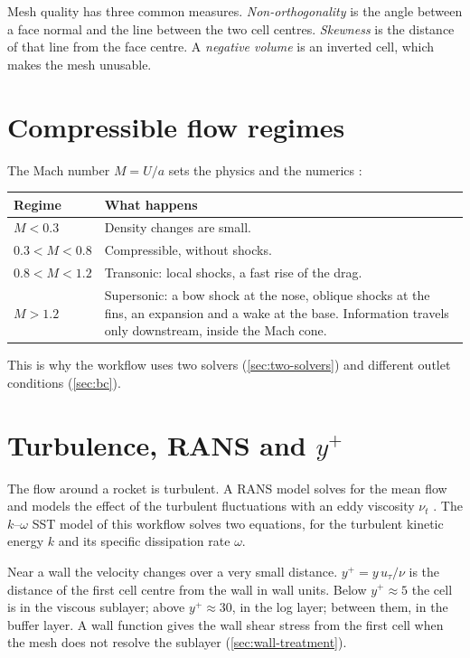 Mesh quality has three common measures. \emph{Non-orthogonality} is the angle between a
face normal and the line between the two cell centres. \emph{Skewness} is the distance
of that line from the face centre. A \emph{negative volume} is an inverted cell, which
makes the mesh unusable.

\section{Compressible flow regimes}

The Mach number $M = U/a$ sets the physics and the numerics \citep{anderson2003}:

\begin{tabularx}{\linewidth}{@{}l L@{}}
\toprule
Regime & What happens \\
\midrule
$M < 0.3$ & Density changes are small. \\
$0.3 < M < 0.8$ & Compressible, without shocks. \\
$0.8 < M < 1.2$ & Transonic: local shocks, a fast rise of the drag. \\
$M > 1.2$ & Supersonic: a bow shock at the nose, oblique shocks at the fins, an expansion and a wake at the base. Information travels only downstream, inside the Mach cone. \\
\bottomrule
\end{tabularx}

\medskip
This is why the workflow uses two solvers (\cref{sec:two-solvers}) and different outlet
conditions (\cref{sec:bc}).

\section{Turbulence, RANS and \texorpdfstring{$y^+$}{y+}}

The flow around a rocket is turbulent. A RANS model solves for the mean flow and
models the effect of the turbulent fluctuations with an eddy viscosity $\nu_t$
\citep{wilcox2006,pope2000}. The $k$--$\omega$ SST model of this workflow solves two
equations, for the turbulent kinetic energy $k$ and its specific dissipation rate
$\omega$.

Near a wall the velocity changes over a very small distance. $y^+ = y\,u_\tau/\nu$ is
the distance of the first cell centre from the wall in wall units. Below $y^+ \approx 5$
the cell is in the viscous sublayer; above $y^+ \approx 30$, in the log layer; between
them, in the buffer layer. A wall function gives the wall shear stress from the first
cell when the mesh does not resolve the sublayer (\cref{sec:wall-treatment}).

